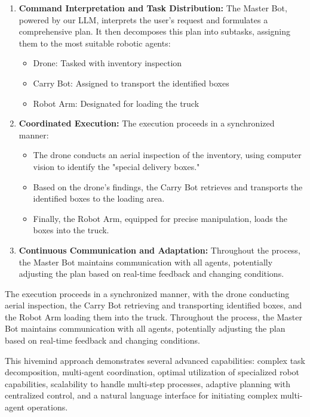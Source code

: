 \documentclass[pdflatex,sn-mathphys-num]{sn-jnl}
\theoremstyle{thmstyleone}
\theoremstyle{thmstyletwo}%
\theoremstyle{thmstylethree}%
\begin{document}
\begin{enumerate}
    \item \textbf{Command Interpretation and Task Distribution:} The Master Bot, powered by our LLM, interprets the user's request and formulates a comprehensive plan. It then decomposes this plan into subtasks, assigning them to the most suitable robotic agents:
    \begin{itemize}
        \item Drone: Tasked with inventory inspection
        \item Carry Bot: Assigned to transport the identified boxes
        \item Robot Arm: Designated for loading the truck
    \end{itemize}

    \item \textbf{Coordinated Execution:} The execution proceeds in a synchronized manner:
    \begin{itemize}
        \item The drone conducts an aerial inspection of the inventory, using computer vision to identify the "special delivery boxes."
        \item Based on the drone's findings, the Carry Bot retrieves and transports the identified boxes to the loading area.
        \item Finally, the Robot Arm, equipped for precise manipulation, loads the boxes into the truck.
    \end{itemize}

    \item \textbf{Continuous Communication and Adaptation:} Throughout the process, the Master Bot maintains communication with all agents, potentially adjusting the plan based on real-time feedback and changing conditions.
\end{enumerate}



The execution proceeds in a synchronized manner, with the drone conducting aerial inspection, the Carry Bot retrieving and transporting identified boxes, and the Robot Arm loading them into the truck. Throughout the process, the Master Bot maintains communication with all agents, potentially adjusting the plan based on real-time feedback and changing conditions.

This hivemind approach demonstrates several advanced capabilities: complex task decomposition, multi-agent coordination, optimal utilization of specialized robot capabilities, scalability to handle multi-step processes, adaptive planning with centralized control, and a natural language interface for initiating complex multi-agent operations.
\end{document}
